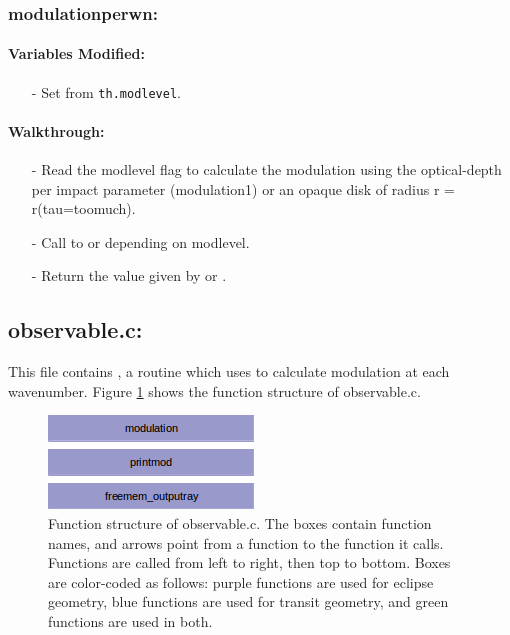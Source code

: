 \documentclass[letterpaper,12pt]{article}
\begin{document}
\subsubsection{modulationperwn:}
\paragraph{Variables Modified:}
\begin{enumerate}[leftmargin=10pt, noitemsep, parsep=0pt, topsep=0ex]
\item[-] Set  from {\tt th.modlevel}.
\end{enumerate}

\paragraph{Walkthrough:}
\begin{enumerate}[leftmargin=10pt, noitemsep, parsep=0pt, topsep=0ex]
\item[-] Read the modlevel flag to calculate the modulation using the
  optical-depth per impact parameter (modulation1) or an opaque disk
  of radius r = r(tau=toomuch).
\item[-] Call to  or  depending on
  modlevel.
\item[-] Return the value given by  or .
\end{enumerate}


\newpage
\subsection{observable.c:}
This file contains , a routine which uses  to calculate modulation at each wavenumber. Figure \ref{fig:observablec} shows the function structure of observable.c.

\begin{figure}
\includegraphics{fig/observablec}
\caption{Function structure of observable.c. The boxes contain function names, and arrows point from a function to the function it calls. Functions are called from left to right, then top to bottom.  Boxes are color-coded as follows:  purple functions are used for eclipse geometry, blue functions are used for transit geometry, and green functions are used in both.}
\label{fig:observablec}
\end{figure}
\end{document}
